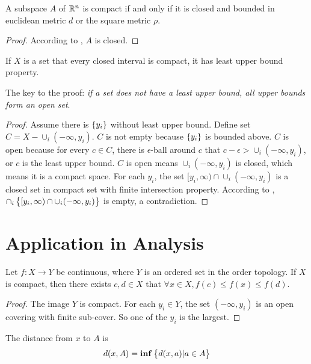\begin{theorem}
    A subspace $A$ of $\mathbb{R}^n$ is compact if and only if it is closed and bounded in euclidean metric $d$ or the square metric $\rho$.    
\end{theorem}
\begin{proof}
    According to , $A$ is closed.
\end{proof}

\begin{theorem}
    If $X$ is a set that every closed interval is compact, it has least upper bound property.    
    
    The key to the proof: \emph{if a set does not have a least upper bound, all upper bounds form an open set}.
\end{theorem}
\begin{proof}
    Assume there is $\set{y_i}$ without least upper bound. Define set $C = X - \cup_i (-\infty,y_i)$. $C$ is not empty because $\set{y_i}$ is bounded above. $C$ is open because for every $c\in C$, there is $\epsilon$-ball around $c$ that $c-\epsilon > \cup_i (-\infty,y_i)$, or $c$ is the least upper bound. $C$ is open means $\cup_i (-\infty,y_i)$ is closed, which means it is a compact space. For each $y_i$, the set $[y_i, \infty) \cap \cup_i (-\infty,y_i)$ is a closed set in compact set with finite intersection property. According to , $\cap_i \set{[y_i, \infty) \cap \cup_i (-\infty,y_i)}$ is empty, a contradiction.
\end{proof}




\section{Application in Analysis}

\begin{theorem}
    Let $f: X \rightarrow Y$ be continuous, where $Y$ is an ordered set in the order topology. If $X$ is compact, then there exists $c,d \in X$ that $\forall x \in X, f(c) \leq f(x) \leq f(d)$.
\end{theorem}
\begin{proof}
    The image $Y$ is compact. For each $y_i \in Y$, the set $(-\infty, y_i)$ is an open covering with finite sub-cover. So one of the $y_i$ is the largest.
\end{proof}

\begin{definition}
    The distance from $x$ to $A$ is
    \begin{equation}
        d(x,A) = \mathbf{inf} \set{d(x,a) | a \in A}
    \end{equation}
\end{definition}

